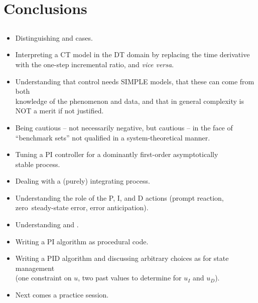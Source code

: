 \section{Conclusions}
\subsection{}

\begin{frame}
\myPause
 \begin{itemize}[<+-| alert@+>]
 \item Distinguishing  and  cases.
 \item Interpreting a CT model in the DT domain by replacing the time derivative\\
       with the one-step incremental ratio, and \emph{vice versa}.
 \item Understanding that control needs SIMPLE models, that these can come from both\\
       knowledge of the phenomenon and data, and that in general complexity is NOT a merit if not justified.
 \item Being cautious -- not necessarily negative, but cautious -- in the face of ``benchmark sets'' not qualified in a system-theoretical manner. 
 \item Tuning a PI controller for a dominantly first-order asymptotically\\
       stable process.
 \item Dealing with a (purely) integrating process.
 \end{itemize}
\end{frame}

\begin{frame}
\myPause
 \begin{itemize}[<+-| alert@+>]
 \item Understanding the role of the P, I, and D actions (prompt reaction, zero\
       steady-state error, error anticipation).
 \item Understanding  and .
 \item Writing a PI algorithm as procedural code.
 \item Writing a PID algorithm and discussing arbitrary choices as for state management\\
      (one constraint on $u$, two past values to determine for $u_I$ and $u_D$).
 \item \vfill Next comes a practice session.
 \end{itemize}
\end{frame}

